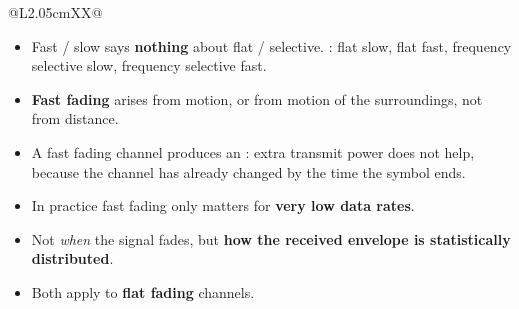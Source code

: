 {\begin{tabularx}{\linewidth}{@{}L{2.05cm}XX@{}}
\bottomrule
\end{tabularx}
\vspace{3pt}
\begin{itemize}
  \item Fast / slow says \textbf{nothing} about flat / selective. : flat slow, flat fast, frequency selective slow, frequency selective fast.
  \item \textbf{Fast fading} arises from motion, or from motion of the surroundings, not from
        distance.
  \item A fast fading channel produces an : extra transmit power does
        not help, because the channel has already changed by the time the symbol ends.
  \item In practice fast fading only matters for \textbf{very low data rates}.
\end{itemize}}

\hr


{\color{sub}\footnotesize {} }

\begin{itemize}
  \item Not \emph{when} the signal fades, but \textbf{how the received envelope is statistically
        distributed}.
  \item Both apply to \textbf{flat fading} channels.
\end{itemize}

